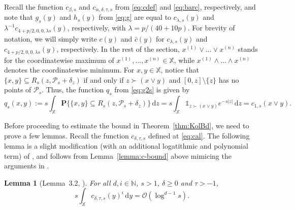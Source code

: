 \documentclass[11pt,reqno]{amsart}
\numberwithin{equation}{section}
\newtheorem{lemma}[theorem]{Lemma}
\theoremstyle{definition}
\newcommand{\sP}{\mathcal{P}}
\newcommand{\N}{\mathbb{N}}
\renewcommand{\P}{\mathbf{P}}
\newcommand{\XX}{\mathbb{X}}
\newcommand{\diff}{{\,\mathrm d}}
\begin{document}
Recall the function $c_{\beta,s}$ and $c_{\alpha,\delta,\tau,s}$ from \eqref{eq:cdef} and \eqref{eq:barc}, respectively, and note that $g_{s}(y)$ and $h_s(y)$ from
\eqref{eq:g} are equal to $c_{\lambda,s}(y)$ and $\lambda^{-1} c_{4+p/2,0,0,\lambda s} (y)$, respectively, with $\lambda=p/(40+10p)$. For brevity of notation, we will simply write $c(y)$ and $\bar c(y)$ for $c_{\lambda,s}(y)$ and $c_{4+p/2,0,0,\lambda s}(y)$, respectively. In the rest of the section,
$x^{(1)}\vee\dots\vee x^{(n)}$ stands for the coordinatewise maximum of
$x^{(1)},\dots,x^{(n)} \in \XX$, while $x^{(1)}\wedge\dots\wedge x^{(n)}$ denotes
the coordinatewise minimum. For $x,y\in \XX$, notice that
$\{x,y\}\subseteq R_{s}(z,\sP_{s}+\delta_z)$ if and only if
$z\succ (x \vee y)$ and $[0,z] \setminus \{z\}$ has no points of $\sP_s$. Thus, the function $q_{s}$ from \eqref{eq:g2s} is given by
\begin{displaymath}
q_{s}(x,y):=s \int_{\XX} \P\big\{\{x,y\} \subseteq R_{s}(z,\sP_{s}
+\delta_z)\big\} \diff z 
= s \int_\XX \mathds{1}_{z\succ (x\vee y)} e^{-s|z|}\diff z
=c_{1,s}(x\vee y).
\end{displaymath}

Before proceeding to estimate the bound in Theorem~\ref{thm:KolBd}, we
need to prove a few lemmas. Recall the function $c_{\delta,\tau,s}$ defined at \eqref{eq:cal}. 
The following lemma is a slight modification (with an additional logatithmic and polynomial term) of \cite[Lemma~3.2]{BM21}, and follows from Lemma~\ref{lemma:c-bound} above mimicing the arguments in \cite[Lemma~3.2]{BM21}.
\begin{lemma}[Lemma~3.2, \cite{BM21}]\label{lem:intbd}
	For all $d,i \in \N$, $s>1$, $\delta \ge 0$ and $\tau>-1$,
	\begin{equation*}
	s\int_{\XX} c_{\delta,\tau,s}(y)^i \diff y=
	\mathcal{O}(\log^{d-1} s).
	\end{equation*}
\end{lemma}
\end{document}
